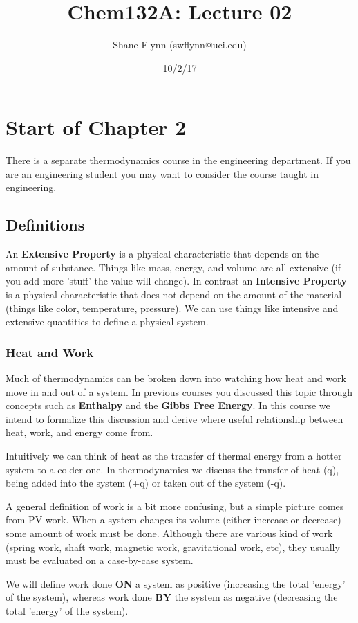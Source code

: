 \documentclass{article}
\title{Chem132A: Lecture 02}
\author{Shane Flynn (swflynn@uci.edu) }
\date{10/2/17}
\begin{document}
\maketitle

\section*{Start of Chapter 2}
There is a separate thermodynamics course in the engineering department. 
If you are an engineering student you may want to consider the course taught in engineering.

\subsection*{Definitions}
An \textbf{Extensive Property} is a physical characteristic that depends on the amount of substance. 
Things like mass, energy, and volume are all extensive (if you add more 'stuff' the value will change). 
In contrast an \textbf{Intensive Property} is a physical characteristic that does not depend on the amount of the material (things like color, temperature, pressure). 
We can use things like intensive and extensive quantities to define a physical system. 

\subsubsection*{Heat and Work}
Much of thermodynamics can be broken down into watching how heat and work move in and out of a system. 
In previous courses you discussed this topic through concepts such as \textbf{Enthalpy} and the \textbf{Gibbs Free Energy}.
In this course we intend to formalize this discussion and derive where useful relationship between heat, work, and energy come from.

Intuitively we can think of heat as the transfer of thermal energy from a hotter system to a colder one. 
In thermodynamics we discuss the transfer of heat (q), being added into the system (+q) or taken out of the system (-q). 

A general definition of work is a bit more confusing, but a simple picture comes from PV work. 
When a system changes its volume (either increase or decrease) some amount of work must be done. 
Although there are various kind of work (spring work, shaft work, magnetic work, gravitational work, etc), they usually must be evaluated on a case-by-case system. 

We will define work done \textbf{ON} a system as positive (increasing the total 'energy' of the system), whereas work done \textbf{BY} the system as negative (decreasing the total 'energy' of the system). 
\end{document}
